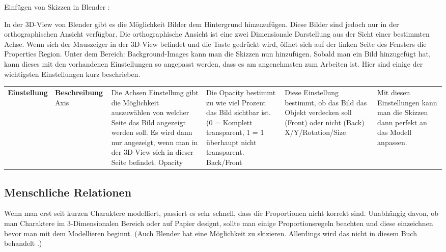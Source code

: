 Einfügen von Skizzen in Blender \citep{blender:background_images}:

In der 3D-View von Blender gibt es die Möglichkeit Bilder dem Hintergrund hinzuzufügen. Diese
Bilder sind jedoch nur in der orthographischen Ansicht verfügbar. Die orthographische Ansicht ist
eine zwei Dimensionale Darstellung aus der Sicht einer bestimmten Achse.
Wenn sich der Mauszeiger in der 3D-View befindet und die Taste  gedrückt wird, öffnet sich
auf der linken Seite des Fensters die Properties Region. Unter dem Bereich: Background-Images kann
man die Skizzen nun hinzufügen. Sobald man ein Bild hinzugefügt hat, kann dieses mit
den vorhandenen Einstellungen so angepasst werden, dass es am angenehmsten zum Arbeiten ist.
Hier sind einige der wichtigsten Einstellungen kurz beschrieben.


\begin{tabular}{p{3.4cm}|p{3.4cm}|p{3.4cm}|p{3.4cm}}
    \textbf{Einstellung} & \textbf{Beschreibung} \hline
    Axis & Die Achsen Einstellung gibt die Möglichkeit auszuwählen von welcher Seite
    das Bild angezeigt werden soll.    Es wird dann nur angezeigt, wenn man in der
    3D-View sich in dieser Seite befindet.\hline
    Opacity & Die Opacity bestimmt zu wie viel Prozent das Bild sichtbar ist.
    (0 = Komplett transparent, 1 = 1 überhaupt nicht transparent.\hline
    Back/Front & Diese Einstellung bestimmt, ob das Bild das Objekt verdecken soll
    (Front) oder nicht (Back) \hline
    X/Y/Rotation/Size & Mit diesen Einstellungen kann man die Skizzen dann perfekt
    an das Modell anpassen. \hline
\end{tabular}


\subsection{Menschliche Relationen}
    Wenn man erst seit kurzen Charaktere modelliert, passiert es sehr schnell, dass die Proportionen
    nicht korrekt sind. Unabhängig davon, ob man Charaktere im 3-Dimensionalen Bereich oder auf Papier
    designt, sollte man einige Proportionsregeln beachten und diese einzeichnen bevor man mit dem
    Modellieren beginnt. (Auch Blender hat eine Möglichkeit zu skizieren. Allerdings wird das nicht in
    diesem Buch behandelt \citep{blender:grease_pencil}.)

